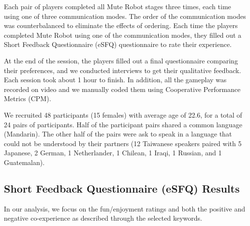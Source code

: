 Each pair of players completed all Mute Robot stages three times, each time using one of three communication modes. The order of the communication modes was counterbalanced to eliminate the effects of ordering.
Each time the players completed Mute Robot using one of the communication modes, they filled out a Short Feedback Questionnaire (eSFQ)\cite{eSFQ} questionnaire to rate their experience. 

At the end of the session, the players filled out a final questionnaire comparing their preferences, and we conducted interviews to get their qualitative feedback. Each session took about 1 hour to finish. 
In addition, all the gameplay was recorded on video and we manually coded them using Cooperative Performance Metrics (CPM)\cite{CPMs}. 

We recruited 48 participants (15 females) with average age of 22.6, for a total of 24 pairs of participants. Half of the participant pairs shared a common language (Mandarin). The other half of the pairs were ask to speak in a language that could not be understood by their partners (12 Taiwanese speakers paired with 5 Japanese, 2 German, 1 Netherlander, 1 Chilean, 1 Iraqi, 1 Russian, and 1 Guatemalan).
  








\subsection{Short Feedback Questionnaire (eSFQ) Results}
In our analysis, we focus on the fun/enjoyment ratings and both the positive and negative co-experience as described through the selected keywords. 


